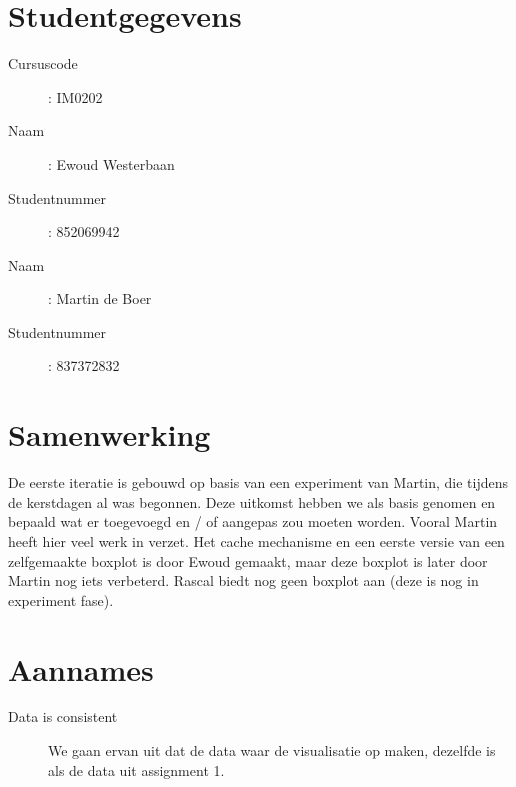 \documentclass[a4paper]{article}
\begin{document}
\pagestyle{fancy}

\section*{Studentgegevens}
\begin{description}
	\item [Cursuscode]: IM0202
	\item [Naam]: Ewoud Westerbaan
	\item [Studentnummer]: 852069942
	\item [Naam]: Martin de Boer
	\item [Studentnummer]: 837372832
\end{description}

\section{Samenwerking}
De eerste iteratie is gebouwd op basis van een experiment van Martin, die tijdens de kerstdagen al was begonnen. Deze uitkomst hebben we als basis genomen en bepaald wat er toegevoegd en / of aangepas zou moeten worden. Vooral Martin heeft hier veel werk in verzet.
Het cache mechanisme en een eerste versie van een zelfgemaakte boxplot is door Ewoud gemaakt, maar deze boxplot is later door Martin nog iets verbeterd. Rascal biedt nog geen boxplot aan (deze is nog in experiment fase).


\section{Aannames}
\begin{description}
\item[Data is consistent] We gaan ervan uit dat de data waar de visualisatie op maken, dezelfde is als de data uit assignment 1.
\end{description}
\end{document}
